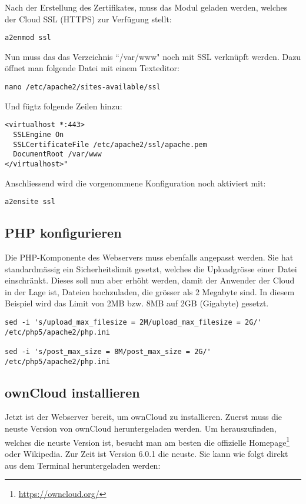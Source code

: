 Nach der Erstellung des Zertifikates, muss das Modul geladen werden, welches der Cloud SSL (HTTPS) zur Verfügung stellt:
\\

\begin{lstlisting}
a2enmod ssl
\end{lstlisting}

Nun muss das das Verzeichnis ``/var/www" noch mit SSL verknüpft werden. Dazu öffnet man folgende Datei mit einem Texteditor: 
\\

\begin{lstlisting}
nano /etc/apache2/sites-available/ssl
\end{lstlisting}

Und fügtz folgende Zeilen hinzu: 
\\

\begin{lstlisting}
<virtualhost *:443>
  SSLEngine On
  SSLCertificateFile /etc/apache2/ssl/apache.pem
  DocumentRoot /var/www  
</virtualhost>" 
\end{lstlisting}

Anschliessend wird die vorgenommene Konfiguration noch aktiviert mit:
\\

\begin{lstlisting}
a2ensite ssl
\end{lstlisting}

\subsection{PHP konfigurieren}
Die PHP-Komponente des Webservers muss ebenfalls angepasst werden. Sie hat standardmässig ein Sicherheitslimit gesetzt, welches die Uploadgrösse einer Datei einschränkt. Dieses soll nun aber erhöht werden, damit der Anwender der Cloud in der Lage ist, Dateien hochzuladen, die grösser als 2 Megabyte sind. In diesem Beispiel wird das Limit von 2MB bzw. 8MB auf 2GB (Gigabyte) gesetzt.
\\

\begin{lstlisting}
sed -i 's/upload_max_filesize = 2M/upload_max_filesize = 2G/' /etc/php5/apache2/php.ini

sed -i 's/post_max_size = 8M/post_max_size = 2G/' /etc/php5/apache2/php.ini
\end{lstlisting}

\subsection{ownCloud installieren}
Jetzt ist der Webserver bereit, um ownCloud zu installieren. Zuerst muss die neuste Version von ownCloud heruntergeladen werden. Um herauszufinden, welches die neuste Version ist, besucht man am besten die offizielle Homepage\footnote{\url{https://owncloud.org/}} oder Wikipedia. Zur Zeit ist Version 6.0.1 die neuste. Sie kann wie folgt direkt aus dem Terminal heruntergeladen werden:
\\


